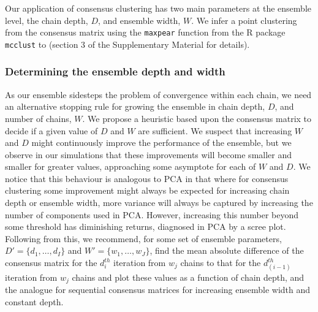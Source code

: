 \documentclass{bmcart}
\begin{document}
Our application of consensus clustering has two main parameters at the ensemble level, the chain depth, $D$, and ensemble width, $W$. We infer a point clustering from the consensus matrix using the \texttt{maxpear} function \citep{fritsch2009improved} from the R package \texttt{mcclust} \citep{fritsch2012mcclust} to (section 3 of the Supplementary Material for details).

\subsubsection*{Determining the ensemble depth and width} \label{sec:ensembleChoice}
As our ensemble sidesteps the problem of convergence within each chain, we need an alternative stopping rule for growing the ensemble in chain depth, $D$, and number of chains, $W$. We propose a heuristic based upon the consensus matrix to decide if a given value of $D$ and $W$ are sufficient. We suspect that increasing $W$ and $D$ might continuously improve the performance of the ensemble, but we observe in our simulations that these improvements will become smaller and smaller for greater values, approaching some asymptote for each of $W$ and $D$. We notice that this behaviour is analogous to PCA in that where for consensus clustering some improvement might always be expected for increasing chain depth or ensemble width, more variance will always be captured by increasing the number of components used in PCA. However, increasing this number beyond some threshold has diminishing returns, diagnosed in PCA by a scree plot. Following from this, we recommend, for some set of ensemble parameters, $D' = \{d_1, \ldots, d_I\}$ and $W'=\{w_1, \ldots, w_J\}$, find the mean absolute difference of the consensus matrix for the $d_i^{th}$ iteration from $w_j$ chains to that for the $d_{(i-1)}^{th}$ iteration from $w_j$ chains and plot these values as a function of chain depth, and the analogue for sequential consensus matrices for increasing ensemble width and constant depth.

\end{document}
